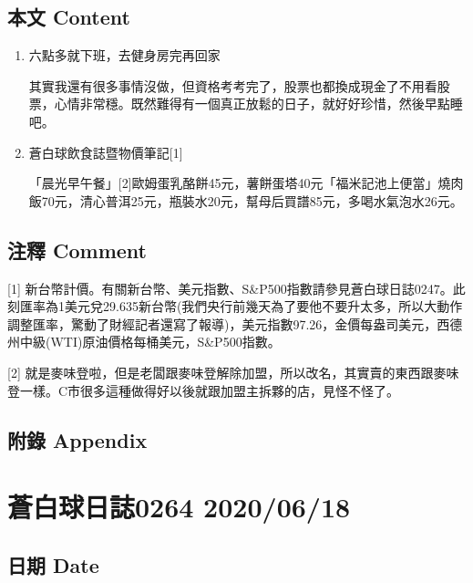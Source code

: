 \documentclass[a5paper, 11pt
]{book}
\begin{document}
\hypertarget{ux672cux6587-content-16}{%
\subsection{本文 Content}\label{ux672cux6587-content-16}}

\begin{enumerate}
\def\labelenumi{\arabic{enumi}.}
\item
  六點多就下班，去健身房完再回家

  其實我還有很多事情沒做，但資格考考完了，股票也都換成現金了不用看股票，心情非常穩。既然難得有一個真正放鬆的日子，就好好珍惜，然後早點睡吧。
\item
  蒼白球飲食誌暨物價筆記{[}1{]}

  「晨光早午餐」{[}2{]}歐姆蛋乳酪餅45元，薯餅蛋塔40元「福米記池上便當」燒肉飯70元，清心普洱25元，瓶裝水20元，幫母后買譜85元，多喝水氣泡水26元。
\end{enumerate}

\hypertarget{ux6ce8ux91cb-comment-16}{%
\subsection{注釋 Comment}\label{ux6ce8ux91cb-comment-16}}

{[}1{]}
新台幣計價。有關新台幣、美元指數、S\&P500指數請參見蒼白球日誌0247。此刻匯率為1美元兌29.635新台幣(我們央行前幾天為了要他不要升太多，所以大動作調整匯率，驚動了財經記者還寫了報導)，美元指數97.26，金價每盎司美元，西德州中級(WTI)原油價格每桶美元，S\&P500指數。

{[}2{]}
就是麥味登啦，但是老闆跟麥味登解除加盟，所以改名，其實賣的東西跟麥味登一樣。C市很多這種做得好以後就跟加盟主拆夥的店，見怪不怪了。

\hypertarget{ux9644ux9304-appendix-16}{%
\subsection{附錄 Appendix}\label{ux9644ux9304-appendix-16}}

\hypertarget{ux84bcux767dux7403ux65e5ux8a8c0264-20200618}{%
\section{蒼白球日誌0264
2020/06/18}\label{ux84bcux767dux7403ux65e5ux8a8c0264-20200618}}

\hypertarget{ux65e5ux671f-date-17}{%
\subsection{日期 Date}\label{ux65e5ux671f-date-17}}
\end{document}
